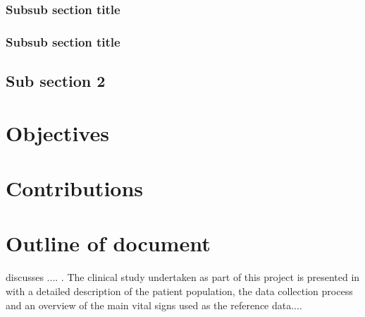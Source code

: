 \subsubsection{Subsub section title}

\lipsum[3-5]

\subsubsection{Subsub section title}

\lipsum[8-10]

\subsection{Sub section 2}

\lipsum[10-12]\cite{cote1988effect,aravindhan2000sulfhemoglobinemia,clayton1991pulse,clayton1991comparison,webb1991potential,212885,964165,Chaichulee2017FG}

\section{Objectives}

\lipsum[2-4]

\section{Contributions}

\lipsum[2-4]

\section{Outline of document}

 discusses .... . The clinical study undertaken as part of this project is presented in  with a detailed description of the patient population, the data collection process and an overview of the main vital signs used as the reference data....

\lipsum[2-4]
